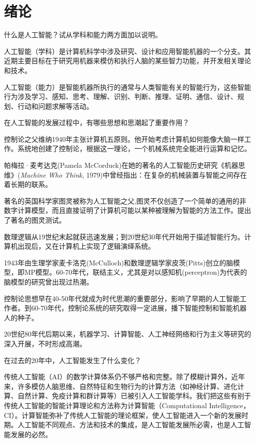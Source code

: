 \chapter{绪论}

\begin{question}
什么是人工智能？试从学科和能力两方面加以说明。
\end{question}	
\begin{solution}
人工智能（学科）是计算机科学中涉及研究、设计和应用智能机器的一个分支。其近期主要目标在于研究用机器来模仿和执行人脑的某些智力功能，并开发相关理论和技术。\par
人工智能（能力）是智能机器所执行的通常与人类智能有关的智能行为，这些智能行为涉及学习、感知、思考、理解、识别、判断、推理、证明、通信、设计、规划、行动和问题求解等活动。
\end{solution}

\begin{question}
在人工智能的发展过程中，有哪些思想和思潮起了重要作用？
\end{question}
\begin{solution}
控制论之父维纳1940年主张计算机五原则。他开始考虑计算机如何能像大脑一样工作。系统地创建了控制论，根据这一理论，一个机械系统完全能进行运算和记忆。\par
帕梅拉·麦考达克(Pamela McCorduck)在她的著名的人工智能历史研究《机器思维》(\textit{Machine Who Think}, 1979)中曾经指出：在复杂的机械装置与智能之间存在着长期的联系。\par
著名的英国科学家图灵被称为人工智能之父,图灵不仅创造了一个简单的通用的非数字计算模型，而且直接证明了计算机可能以某种被理解为智能的方法工作。提出了著名的图灵测试。\par
数理逻辑从19世纪末起就获迅速发展；到20世纪30年代开始用于描述智能行为。计算机出现后，又在计算机上实现了逻辑演绎系统。\par
1943年由生理学家麦卡洛克(McCulloch)和数理逻辑学家皮茨(Pitts)创立的脑模型，即MP模型。60-70年代，联结主义，尤其是对以感知机(perceptron)为代表的脑模型的研究曾出现过热潮。\par
控制论思想早在40-50年代就成为时代思潮的重要部分，影响了早期的人工智能工作者。到60-70年代，控制论系统的研究取得一定进展，播下智能控制和智能机器人的种子。\par
20世纪80年代后期以来，机器学习、计算智能、人工神经网络和行为主义等研究的深入开展，不时形成高潮。
\end{solution}

\begin{question}
在过去的20年中，人工智能发生了什么变化？
\end{question}
\begin{solution}
传统人工智能（AI）的数学计算体系仍不够严格和完整。除了模糊计算外，近年来，许多模仿人脑思维、自然特征和生物行为的计算方法（如神经计算、进化计算、自然计算、免疫计算和群计算等）已被引入人工智能学科。我们把这些有别于传统人工智能的智能计算理论和方法称为计算智能（Computational Intelligence，CI）。计算智能弥补了传统人工智能的理论框架，使人工智能进入一个新的发展时期。人工智能不同观点、方法和技术的集成，是人工智能发展所必需，也是人工智能发展的必然。
\end{solution}

